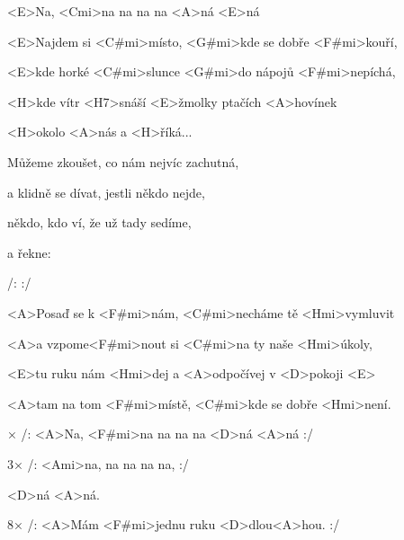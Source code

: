 

<E>Na, <Cmi>na na na na <A>ná <E>ná

\zs
<E>Najdem si <C#mi>místo, <G#mi>kde se dobře <F#mi>kouří,

<E>kde horké <C#mi>slunce <G#mi>do nápojů <F#mi>nepíchá,

<H>kde vítr <H7>snáší <E>žmolky ptačích <A>hovínek

<H>okolo <A>nás a <H>říká...
\ks

\zs
Můžeme zkoušet, co nám nejvíc zachutná,

a klidně se dívat, jestli někdo nejde,

někdo, kdo ví, že už tady sedíme,

a řekne: 
\ks

\zr
/:  :/
\kr

\zs
<A>Posaď se k <F#mi>nám, <C#mi>necháme tě <Hmi>vymluvit

<A>a vzpome<F#mi>nout si <C#mi>na ty naše <Hmi>úkoly,

<E>tu ruku nám <Hmi>dej a <A>odpočívej v <D>pokoji 
<E>

\bigskip

<A>tam na tom <F#mi>místě, <C#mi>kde se dobře <Hmi>není.
\ks

× /: <A>Na, <F#mi>na na na na <D>ná <A>ná :/

3× /: <Ami>na, na na na na, :/

<D>ná <A>ná.

8× /: <A>Mám <F#mi>jednu ruku <D>dlou<A>hou. :/
\kr

\kp
